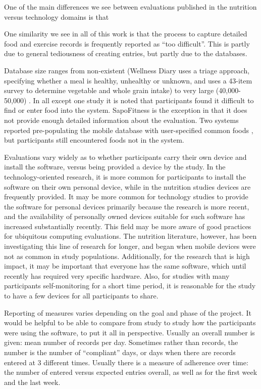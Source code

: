 One of the main differences we see between evaluations published in the nutrition versus technology domains is that 

One similarity we see in all of this work is that the process to capture detailed food and exercise records is frequently reported as ``too difficult''. This is partly due to general tediousness of creating entries, but partly due to the databases. 

Database size ranges from non-existent (Wellness Diary \citep{mattila_mobile_2008} uses a triage approach, specifying whether a meal is healthy, unhealthy or unknown, and \citep{atienza_using_2008} uses a 43-item survey to determine vegetable and whole grain intake) to very large (40,000-50,000) \citep{yon_personal_2007}. In all except one study it is noted that participants found it difficult to find or enter food into the system. SapoFitness \citep{silva_sapofitness:_2011} is the exception in that it does not provide enough detailed information about the evaluation.  Two systems reported pre-populating the mobile database with user-specified common foods \citep{tsai_usability_2007,glanz_improving_2006}, but participants still encountered foods not in the system. 

Evaluations vary widely as to whether participants carry their own device and install the software, versus being provided a device by the study. In the technology-oriented research, it is more common for participants to install the software on their own personal device, while in the nutrition studies devices are frequently provided. It may be more common for technology studies to provide the software for personal devices primarily because the research is more recent, and the availability of personally owned devices suitable for such software has increased substantially recently. This field may be more aware of good practices for ubiquitous computing evaluations. The nutrition literature, however, has been investigating this line of research for longer, and began when mobile devices were not as common in study populations. Additionally, for the research that is high impact, it may be important that everyone has the same software, which until recently has required very specific hardware. Also, for studies with many participants self-monitoring for a short time period, it is reasonable for the study to have a few devices for all participants to share. 

Reporting of measures varies depending on the goal and phase of the project. It would be helpful to be able to compare from study to study how the participants were using the software, to put it all in perspective. Usually an overall number is given: mean number of records per day. Sometimes rather than records, the number is the number of ``compliant'' days, or days when there are records entered at 3 different times. Usually there is a measure of adherence over time: the number of entered versus expected entries overall, as well as for the first week and the last week. 


